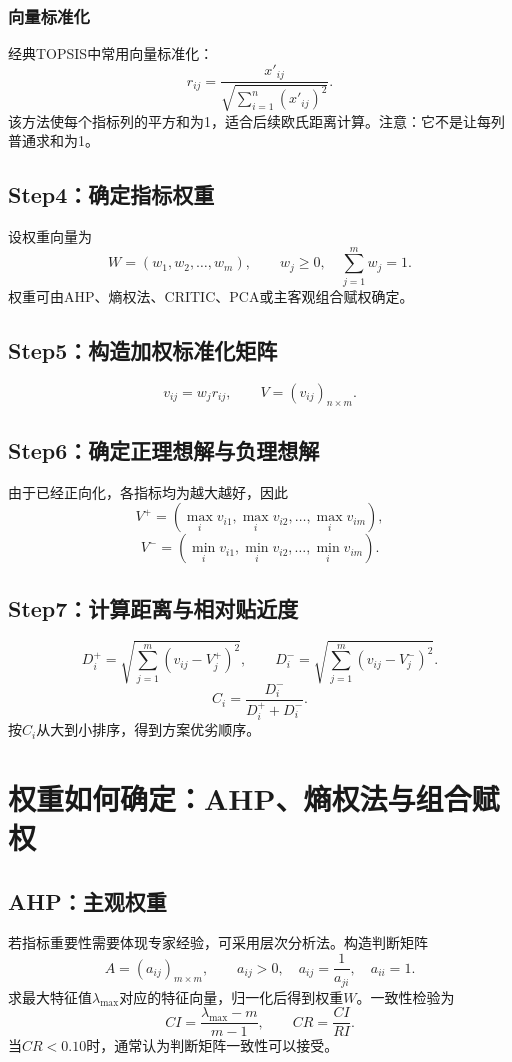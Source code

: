 \documentclass[UTF8,a4paper,12pt,fontset=none]{ctexart}
\begin{document}
\subsubsection{向量标准化}
经典TOPSIS中常用向量标准化：
\[
r_{ij}=\frac{x'_{ij}}{\sqrt{\sum_{i=1}^{n}(x'_{ij})^2}}.
\]
该方法使每个指标列的平方和为1，适合后续欧氏距离计算。注意：它不是让每列普通求和为1。

\subsection{Step4：确定指标权重}
设权重向量为
\[
W=(w_1,w_2,\ldots,w_m),\qquad w_j\ge0,\quad \sum_{j=1}^{m}w_j=1.
\]
权重可由AHP、熵权法、CRITIC、PCA或主客观组合赋权确定。

\subsection{Step5：构造加权标准化矩阵}
\[
v_{ij}=w_j r_{ij},\qquad V=(v_{ij})_{n\times m}.
\]

\subsection{Step6：确定正理想解与负理想解}
由于已经正向化，各指标均为越大越好，因此
\[
V^+=(\max_i v_{i1},\max_i v_{i2},\ldots,\max_i v_{im}),
\]
\[
V^-=(\min_i v_{i1},\min_i v_{i2},\ldots,\min_i v_{im}).
\]

\subsection{Step7：计算距离与相对贴近度}
\[
D_i^+=\sqrt{\sum_{j=1}^{m}(v_{ij}-V_j^+)^2},\qquad
D_i^-=\sqrt{\sum_{j=1}^{m}(v_{ij}-V_j^-)^2}.
\]
\[
C_i=\frac{D_i^-}{D_i^++D_i^-}.
\]
按$C_i$从大到小排序，得到方案优劣顺序。

\section{权重如何确定：AHP、熵权法与组合赋权}

\subsection{AHP：主观权重}
若指标重要性需要体现专家经验，可采用层次分析法。构造判断矩阵
\[
A=(a_{ij})_{m\times m},\qquad a_{ij}>0,\quad a_{ij}=\frac{1}{a_{ji}},\quad a_{ii}=1.
\]
求最大特征值$\lambda_{\max}$对应的特征向量，归一化后得到权重$W$。一致性检验为
\[
CI=\frac{\lambda_{\max}-m}{m-1},\qquad CR=\frac{CI}{RI}.
\]
当$CR<0.10$时，通常认为判断矩阵一致性可以接受。
\end{document}
